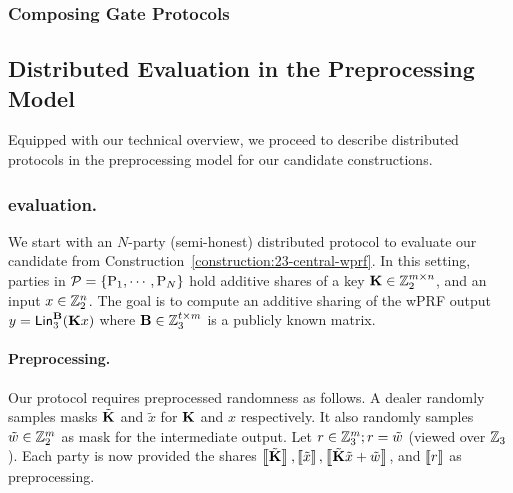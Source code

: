 \subsubsection{Composing Gate Protocols}

\subsection{Distributed Evaluation in the Preprocessing Model}
Equipped with our technical overview, we proceed to describe distributed protocols in the preprocessing model for our candidate constructions. 

\subsubsection{\ttwPRF evaluation.}

We start with an $N$-party (semi-honest) distributed protocol to evaluate our \ttwPRF candidate from Construction~\ref{construction:23-central-wprf}. In this setting, parties in $\mathcal{P} = \{\textnormal{P}_1, \cdots, \textnormal{P}_N\}$ hold additive shares of a key $\mat{K} \in \Z_2^{m \times n}$, and an input $x \in \mathbb{Z}_2^n$. The goal is to compute an additive sharing of the wPRF output $y = \LMap^\mat{B}_3(\mat{K}x)$ where $\mat{B} \in \Z_3^{t \times m}$ is a publicly known matrix.

\paragraph{Preprocessing.}
Our protocol requires preprocessed randomness as follows. A dealer randomly samples masks $\tilde{\mat{K}}$ and $\tilde{x}$ for $\mat{K}$ and $x$ respectively. It also randomly samples $\tilde{w} \in \mathbb{Z}_2^m$ as mask for the intermediate output. Let $r \in \mathbb{Z}_3^m; r = \tilde{w}$ (viewed over $\mathbb{Z}_3$). Each party is now provided the shares $\share{\tilde{\mat{K}}}, \share{\tilde{x}}, \share{\tilde{\mat{K}}\tilde{x} + \tilde{w}}$, and $\left\llbracket r \right\rrbracket$ as preprocessing.

